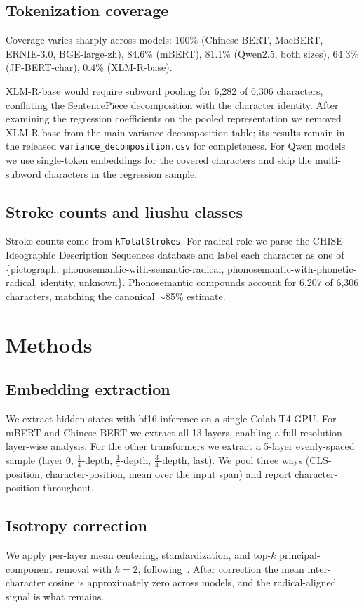 \documentclass[11pt,a4paper,twocolumn]{article}
\begin{document}
\subsection{Tokenization coverage}
Coverage varies sharply across models: 100\% (Chinese-BERT, MacBERT,
ERNIE-3.0, BGE-large-zh), 84.6\% (mBERT), 81.1\% (Qwen2.5, both sizes),
64.3\% (JP-BERT-char), 0.4\% (XLM-R-base).

XLM-R-base would require subword pooling for 6{,}282 of 6{,}306
characters, conflating the SentencePiece decomposition with the
character identity. After examining the regression coefficients on the
pooled representation we removed XLM-R-base from the main
variance-decomposition table; its results remain in the released
\texttt{variance\_decomposition.csv} for completeness. For Qwen models
we use single-token embeddings for the covered characters and skip the
multi-subword characters in the regression sample.

\subsection{Stroke counts and liushu classes}
Stroke counts come from \texttt{kTotalStrokes}. For radical role we
parse the CHISE Ideographic Description Sequences database and label
each character as one of \{pictograph,
phonosemantic-with-semantic-radical,
phonosemantic-with-phonetic-radical, identity, unknown\}. Phonosemantic
compounds account for 6{,}207 of 6{,}306 characters, matching the
canonical $\sim$85\% estimate.

\section{Methods}

\subsection{Embedding extraction}
We extract hidden states with bf16 inference on a single Colab T4 GPU.
For mBERT and Chinese-BERT we extract all 13 layers, enabling a
full-resolution layer-wise analysis. For the other transformers we
extract a 5-layer evenly-spaced sample (layer 0,
$\tfrac{1}{4}$-depth, $\tfrac{1}{2}$-depth, $\tfrac{3}{4}$-depth, last).
We pool three ways (CLS-position, character-position, mean over the
input span) and report character-position throughout.

\subsection{Isotropy correction}
We apply per-layer mean centering, standardization, and top-$k$
principal-component removal with $k = 2$,
following~\cite{MuViswanath2018}. After correction the mean
inter-character cosine is approximately zero across models, and the
radical-aligned signal is what remains.
\end{document}
